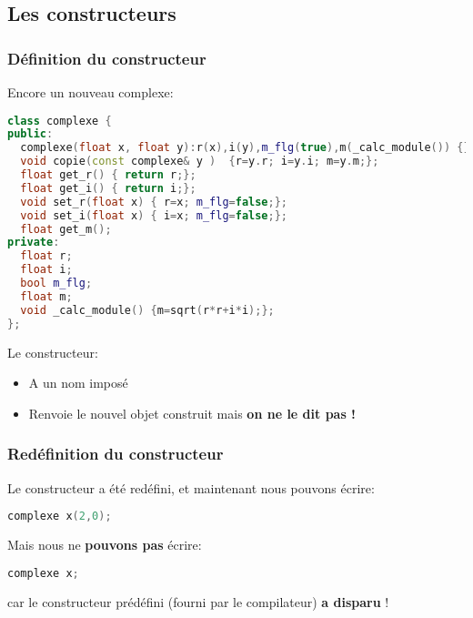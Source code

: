 \documentclass{beamer}
\begin{document}
\subsection{Les constructeurs}
\begin{frame}[fragile=singleslide,shrink=20]
\frametitle {Définition du constructeur}
Encore un nouveau complexe:
\begin{lstlisting}[language=c++]
class complexe {
public:
  complexe(float x, float y):r(x),i(y),m_flg(true),m(_calc_module()) {}; 
  void copie(const complexe& y )  {r=y.r; i=y.i; m=y.m;};
  float get_r() { return r;};
  float get_i() { return i;};
  void set_r(float x) { r=x; m_flg=false;};
  void set_i(float x) { i=x; m_flg=false;};
  float get_m();
private:
  float r;
  float i;
  bool m_flg;
  float m;
  void _calc_module() {m=sqrt(r*r+i*i);};
};
\end{lstlisting}

Le constructeur:
\begin{itemize}
\item{A un nom imposé}
\item{Renvoie le nouvel objet construit mais \textbf{on ne le dit pas !}}
\end{itemize}
\end{frame}

\begin{frame}[fragile=singleslide,shrink=20]
\frametitle {Redéfinition du constructeur}
Le constructeur a été redéfini, et maintenant nous pouvons écrire:

\begin{lstlisting}[language=c++]
complexe x(2,0);
\end{lstlisting}

Mais nous ne \textbf{pouvons pas} écrire:
\begin{lstlisting}[language=c++]
complexe x;
\end{lstlisting}
car le constructeur prédéfini (fourni par le compilateur) \textbf{a disparu} !
\end{frame}
\end{document}
